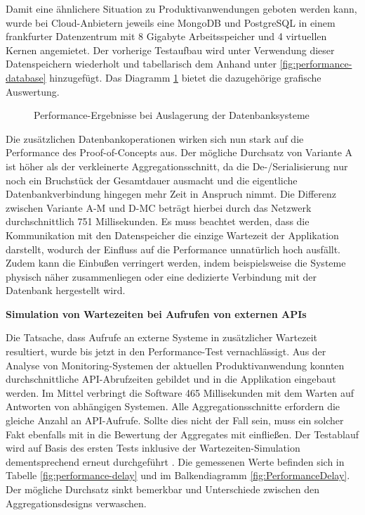 Damit eine ähnlichere Situation zu Produktivanwendungen geboten werden kann, wurde bei Cloud-Anbietern jeweils eine MongoDB und PostgreSQL in einem frankfurter Datenzentrum mit 8 Gigabyte Arbeitsspeicher und 4 virtuellen Kernen angemietet. Der vorherige Testaufbau wird unter Verwendung dieser Datenspeichern wiederholt und tabellarisch dem Anhand unter \ref{fig:performance-database} hinzugefügt. Das Diagramm \ref{fig:PerformanceDatabase} bietet die dazugehörige grafische Auswertung.

\begin{figure}
	\centering
	\footnotesize
	
	\caption{Performance-Ergebnisse bei Auslagerung der Datenbanksysteme}
	\label{fig:PerformanceDatabase}
\end{figure}

Die zusätzlichen Datenbankoperationen wirken sich nun stark auf die Performance des Proof-of-Concepts aus. Der mögliche Durchsatz von Variante A ist höher als der verkleinerte Aggregationsschnitt, da die De-/Serialisierung nur noch ein Bruchstück der Gesamtdauer ausmacht und die eigentliche Datenbankverbindung hingegen mehr Zeit in Anspruch nimmt. Die Differenz zwischen Variante A-M und D-MC beträgt hierbei durch das Netzwerk durchschnittlich 751 Millisekunden. Es muss beachtet werden, dass die Kommunikation mit den Datenspeicher die einzige Wartezeit der Applikation darstellt, wodurch der Einfluss auf die Performance unnatürlich hoch ausfällt. Zudem kann die Einbußen verringert werden, indem beispielsweise die Systeme physisch näher zusammenliegen oder eine dedizierte Verbindung mit der Datenbank hergestellt wird.


\textbf{Simulation von Wartezeiten bei Aufrufen von externen APIs}

Die Tatsache, dass Aufrufe an externe Systeme in zusätzlicher Wartezeit resultiert, wurde bis jetzt in den Performance-Test vernachlässigt. Aus der Analyse von Monitoring-Systemen der aktuellen Produktivanwendung konnten durchschnittliche API-Abrufzeiten gebildet und in die Applikation eingebaut werden. Im Mittel verbringt die Software 465 Millisekunden mit dem Warten auf Antworten von abhängigen Systemen. Alle Aggregationsschnitte erfordern die gleiche Anzahl an API-Aufrufe. Sollte dies nicht der Fall sein, muss ein solcher Fakt ebenfalls mit in die Bewertung der Aggregates mit einfließen. Der Testablauf wird auf Basis des ersten Tests inklusive der Wartezeiten-Simulation dementsprechend erneut durchgeführt . Die gemessenen Werte befinden sich in Tabelle \ref{fig:performance-delay} und im Balkendiagramm \ref{fig:PerformanceDelay}. Der mögliche Durchsatz sinkt bemerkbar und Unterschiede zwischen den Aggregationsdesigns verwaschen.

